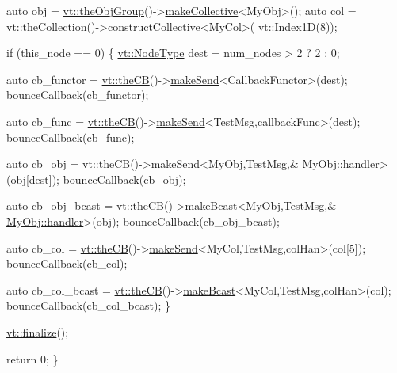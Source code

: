 \begin{DoxyCodeInclude}
  \textcolor{keyword}{auto} obj = \hyperlink{namespacevt_a833f0115b692f578167cbd88e30d39c5}{vt::theObjGroup}()->\hyperlink{structvt_1_1objgroup_1_1_obj_group_manager_a651c44a47c6bcdc9f1b6c9e857fa03f2}{makeCollective}<MyObj>();
  \textcolor{keyword}{auto} col = \hyperlink{namespacevt_a1c45ce63bfd2c327ff7d76a319a371d8}{vt::theCollection}()->\hyperlink{structvt_1_1vrt_1_1collection_1_1_collection_manager_aa2531212565b2c6f85fa3b55d278bbba}{constructCollective}<MyCol>(
      \hyperlink{namespacevt_a5540efc78234273e1796fb003fe4d234}{vt::Index1D}(8));

  \textcolor{keywordflow}{if} (this\_node == 0) \{
    \hyperlink{namespacevt_a866da9d0efc19c0a1ce79e9e492f47e2}{vt::NodeType} dest = num\_nodes > 2 ? 2 : 0;

    \textcolor{keyword}{auto} cb\_functor = \hyperlink{namespacevt_a673b109e94c7bca58313504c83e1da94}{vt::theCB}()->\hyperlink{structvt_1_1pipe_1_1_pipe_manager_a73583be6260418b13ee66e56cdade2da}{makeSend}<CallbackFunctor>(dest);
    bounceCallback(cb\_functor);

    \textcolor{keyword}{auto} cb\_func = \hyperlink{namespacevt_a673b109e94c7bca58313504c83e1da94}{vt::theCB}()->\hyperlink{structvt_1_1pipe_1_1_pipe_manager_a73583be6260418b13ee66e56cdade2da}{makeSend}<TestMsg,callbackFunc>(dest);
    bounceCallback(cb\_func);

    \textcolor{keyword}{auto} cb\_obj = \hyperlink{namespacevt_a673b109e94c7bca58313504c83e1da94}{vt::theCB}()->\hyperlink{structvt_1_1pipe_1_1_pipe_manager_a73583be6260418b13ee66e56cdade2da}{makeSend}<MyObj,TestMsg,&
      \hyperlink{namespacevt_1_1config_a6bd1d6215bda0d8ca02811798399f689a82a0081a94d5c5dfd18b0b3f7eca64b7}{MyObj::handler}>(obj[dest]);
    bounceCallback(cb\_obj);

    \textcolor{keyword}{auto} cb\_obj\_bcast = \hyperlink{namespacevt_a673b109e94c7bca58313504c83e1da94}{vt::theCB}()->\hyperlink{structvt_1_1pipe_1_1_pipe_manager_a2ea6bd5ea3e001662681b1e5a1971e9d}{makeBcast}<MyObj,TestMsg,&
      \hyperlink{namespacevt_1_1config_a6bd1d6215bda0d8ca02811798399f689a82a0081a94d5c5dfd18b0b3f7eca64b7}{MyObj::handler}>(obj);
    bounceCallback(cb\_obj\_bcast);

    \textcolor{keyword}{auto} cb\_col = \hyperlink{namespacevt_a673b109e94c7bca58313504c83e1da94}{vt::theCB}()->\hyperlink{structvt_1_1pipe_1_1_pipe_manager_a73583be6260418b13ee66e56cdade2da}{makeSend}<MyCol,TestMsg,colHan>(col[5]);
    bounceCallback(cb\_col);

    \textcolor{keyword}{auto} cb\_col\_bcast = \hyperlink{namespacevt_a673b109e94c7bca58313504c83e1da94}{vt::theCB}()->\hyperlink{structvt_1_1pipe_1_1_pipe_manager_a2ea6bd5ea3e001662681b1e5a1971e9d}{makeBcast}<MyCol,TestMsg,colHan>(col);
    bounceCallback(cb\_col\_bcast);
  \}

  \hyperlink{namespacevt_a540d90dbd6e97b69f1dcbc9ee9314cff}{vt::finalize}();

  \textcolor{keywordflow}{return} 0;
\}
\end{DoxyCodeInclude}
